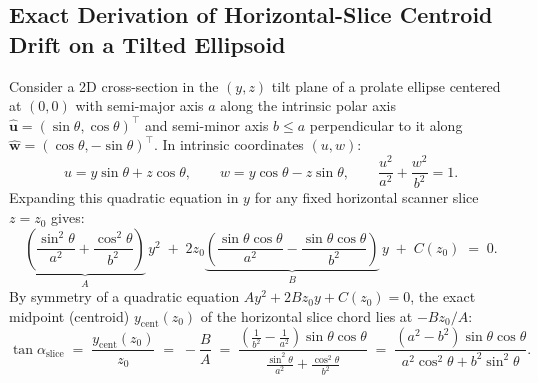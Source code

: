\documentclass[10pt,a4paper]{article}
\renewcommand{\_}{\origunderscore\allowbreak}
\begin{document}
\subsection{Exact Derivation of Horizontal-Slice Centroid Drift on a Tilted Ellipsoid}

Consider a 2D cross-section in the $(y, z)$ tilt plane of a prolate ellipse centered at $(0, 0)$ with semi-major axis $a$ along the intrinsic polar axis $\hat{\mathbf{u}} = (\sin\theta, \cos\theta)^\top$ and semi-minor axis $b \le a$ perpendicular to it along $\hat{\mathbf{w}} = (\cos\theta, -\sin\theta)^\top$. In intrinsic coordinates $(u, w)$:
\begin{equation}
    u = y\sin\theta + z\cos\theta, \qquad w = y\cos\theta - z\sin\theta, \qquad
    \frac{u^2}{a^2} + \frac{w^2}{b^2} = 1.
\end{equation}
Expanding this quadratic equation in $y$ for any fixed horizontal scanner slice $z = z_0$ gives:
\begin{equation}
    \underbrace{\left(\frac{\sin^2\theta}{a^2} + \frac{\cos^2\theta}{b^2}\right)}_{A}\,y^2
    \;+\;
    2z_0\underbrace{\left(\frac{\sin\theta\cos\theta}{a^2} - \frac{\sin\theta\cos\theta}{b^2}\right)}_{B}\,y
    \;+\; C(z_0) \;=\; 0.
\end{equation}
By symmetry of a quadratic equation $Ay^2 + 2Bz_0 y + C(z_0) = 0$, the exact midpoint (centroid) $y_{\text{cent}}(z_0)$ of the horizontal slice chord lies at $-B z_0 / A$:
\begin{equation}
    \tan\alpha_{\text{slice}} \;=\; \frac{y_{\text{cent}}(z_0)}{z_0}
    \;=\; -\frac{B}{A}
    \;=\; \frac{\left(\frac{1}{b^2} - \frac{1}{a^2}\right)\sin\theta\cos\theta}{\frac{\sin^2\theta}{a^2} + \frac{\cos^2\theta}{b^2}}
    \;=\; \frac{(a^2 - b^2)\sin\theta\cos\theta}{a^2\cos^2\theta + b^2\sin^2\theta}.
    \label{eq:ellipsoid_proof}
\end{equation}
\end{document}

